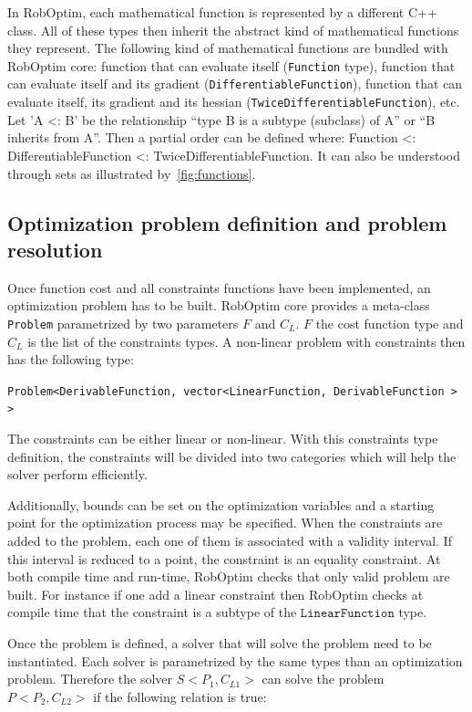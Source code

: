 \documentclass[conference,final,a4paper,twocolumn,9pt]{IEEEtran}
\begin{document}
In RobOptim, each mathematical function is represented by a different
C++ class. All of these types then inherit the abstract kind of
mathematical functions they represent. The following kind of
mathematical functions are bundled with RobOptim core: function that
can evaluate itself (\texttt{Function} type), function that can
evaluate itself and its gradient (\texttt{DifferentiableFunction}),
function that can evaluate itself, its gradient and its hessian
(\texttt{TwiceDifferentiableFunction}), etc.  Let 'A <: B' be the
relationship ``type B is a subtype (subclass) of A'' or ``B inherits
from A''. Then a partial order can be defined where: Function <:
DifferentiableFunction <: TwiceDifferentiableFunction. It can also be
understood through sets as illustrated by~\autoref{fig:functions}.


\subsection{Optimization problem definition and problem resolution}


Once function cost and all constraints functions have been
implemented, an optimization problem has to be built. RobOptim core
provides a meta-class \texttt{Problem} parametrized by two parameters
$F$ and $C_L$. $F$ the cost function type and $C_L$ is the list of the
constraints types. A non-linear problem with constraints then has the
following type:


\texttt{Problem<DerivableFunction, vector<LinearFunction, DerivableFunction > >}


The constraints can be either linear or non-linear. With this
constraints type definition, the constraints will be divided into two
categories which will help the solver perform efficiently.

Additionally, bounds can be set on the optimization variables and a
starting point for the optimization process may be specified. When the
constraints are added to the problem, each one of them is associated
with a validity interval. If this interval is reduced to a point, the
constraint is an equality constraint. At both compile time and
run-time, RobOptim checks that only valid problem are built. For
instance if one add a linear constraint then RobOptim checks at
compile time that the constraint is a subtype of the
$\texttt{LinearFunction}$ type.


Once the problem is defined, a solver that will solve the problem need
to be instantiated. Each solver is parametrized by the same types than
an optimization problem. Therefore the solver $S<P_1,C_{L1}>$ can
solve the problem $P<P_2,C_{L2}>$ if the following relation is true:
\end{document}
